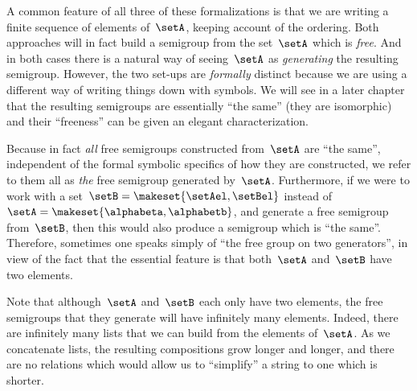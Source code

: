 A common feature of all three of these formalizations is that we are writing a finite sequence of elements of~$\setA$, keeping account of the ordering.
Both approaches will in fact build a semigroup from the set~$\setA$ which is \emph{free}.
And in both cases there is a natural way of seeing~$\setA$ as \emph{generating} the resulting semigroup.
However, the two set-ups are \emph{formally} distinct because we are using a different way of writing things down with symbols.
We will see in a later chapter that the resulting semigroups are essentially ``the same'' (they are isomorphic) and their ``freeness'' can be given an elegant characterization.

Because in fact \emph{all} free semigroups constructed from~$\setA$ are ``the same'', independent of the formal symbolic specifics of how they are constructed, we refer to them all as \emph{the} free semigroup generated by~$\setA$.
Furthermore, if we were to work with a set~$\setB = \makeset{ \setAel, \setBel }$ instead of~$\setA = \makeset{ \alphabeta, \alphabetb}$, and generate a free semigroup from~$\setB$, then this would also produce a semigroup which is ``the same''.
Therefore, sometimes one speaks simply of ``the free group on two generators'', in view of the fact that the essential feature is that both~$\setA$ and~$\setB$ have two elements.

Note that although~$\setA$ and~$\setB$ each only have two elements, the free semigroups that they generate will have infinitely many elements.
Indeed, there are infinitely many lists that we can build from the elements of~$\setA$.
As we concatenate lists, the resulting compositions grow longer and longer, and there are no relations which would allow us to ``simplify'' a string to one which is shorter.

